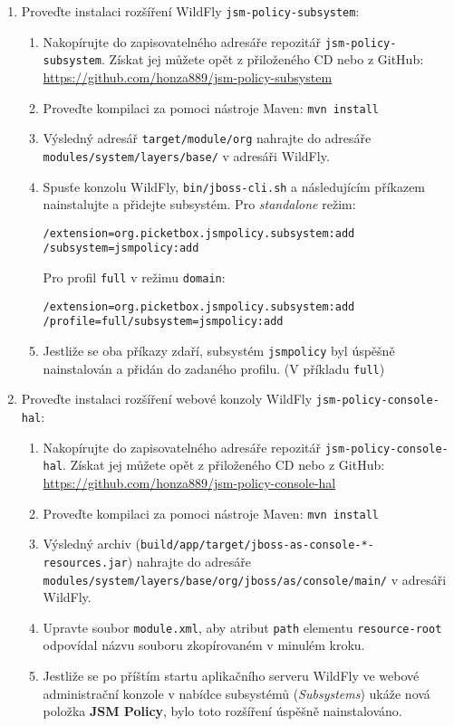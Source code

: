 \begin{enumerate}
  \item Proveďte instalaci rozšíření WildFly {\tt jsm-policy-subsystem}:
  \begin{enumerate}
    \item Nakopírujte do zapisovatelného adresáře repozitář {\tt jsm-policy-subsystem}. Získat jej můžete opět z přiloženého CD nebo z GitHub:
      \newline\url{https://github.com/honza889/jsm-policy-subsystem}
    \item Proveďte kompilaci za pomoci nástroje Maven: {\tt mvn install}
    \item Výsledný adresář {\tt target/module/org} nahrajte do adresáře {\tt modules/system/la\linebreak yers/base/} v adresáři WildFly.
    \item Spusťe konzolu WildFly, {\tt bin/jboss-cli.sh} a následujícím příkazem nainstalujte a přidejte subsystém. Pro {\it standalone} režim:
      \begin{lstlisting}
/extension=org.picketbox.jsmpolicy.subsystem:add
/subsystem=jsmpolicy:add
      \end{lstlisting}
      Pro profil {\tt full} v režimu {\tt domain}:
      \begin{lstlisting}
/extension=org.picketbox.jsmpolicy.subsystem:add
/profile=full/subsystem=jsmpolicy:add
      \end{lstlisting}
    \item Jestliže se oba příkazy zdaří, subsystém {\tt jsmpolicy} byl úspěšně nainstalován a přidán do zadaného profilu. (V příkladu {\tt full})
  \end{enumerate}
  
  \item Proveďte instalaci rozšíření webové konzoly WildFly {\tt jsm-policy-console-hal}:
  \begin{enumerate}
    \item Nakopírujte do zapisovatelného adresáře repozitář {\tt jsm-policy-console-hal}. Získat jej můžete opět z přiloženého CD nebo z GitHub:
      \newline\url{https://github.com/honza889/jsm-policy-console-hal}
    \item Proveďte kompilaci za pomoci nástroje Maven: {\tt mvn install}
    \item Výsledný archiv ({\tt build/app/target/jboss-as-console-*-resources.jar}) nahrajte do adresáře {\tt modules/system/layers/base/org/jboss/as/console/main/} v adresáři WildFly.
    \item Upravte soubor {\tt module.xml}, aby atribut {\tt path} elementu {\tt resource-root} odpovídal názvu souboru zkopírovaném v minulém kroku.    
    \item Jestliže se po příštím startu aplikačního serveru WildFly ve webové administrační konzole v nabídce subsystémů ({\it Subsystems}) ukáže nová položka {\bf JSM Policy}, bylo toto rozšíření úspěšně nainstalováno.
  \end{enumerate}
  
\end{enumerate}


